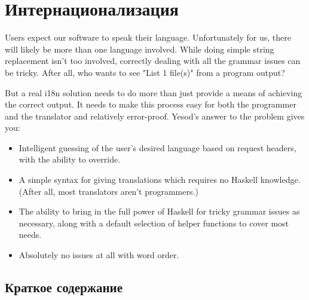 \chapter{Интернационализация} %

Users expect our software to speak their language. Unfortunately for us, there will likely be more than one language involved. While doing simple string replacement isn't too involved, correctly dealing with all the grammar issues can be tricky. After all, who wants to see "List 1 file(s)" from a program output?

But a real i18n solution needs to do more than just provide a means of achieving the correct output. It needs to make this process easy for both the programmer and the translator and relatively error-proof. Yesod's answer to the problem gives you:

\begin{itemize}
  \item Intelligent guessing of the user's desired language based on request headers, with the ability to override.
  \item A simple syntax for giving translations which requires no Haskell knowledge. (After all, most translators aren't programmers.)
  \item The ability to bring in the full power of Haskell for tricky grammar issues as necessary, along with a default selection of helper functions to cover most needs.
  \item Absolutely no issues at all with word order.
\end{itemize}

\section{Краткое содержание} %

